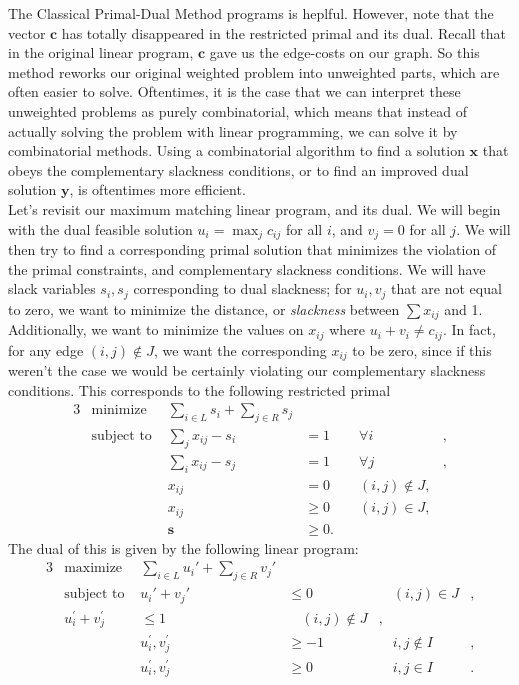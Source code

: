 \documentclass[11pt]{article}
\renewcommand{\'}{^{'}}
\begin{document}
\begin{section}{The Classical Primal-Dual Method}
	programs is heplful. However,  note that the vector $\mathbf{c}$ has totally disappeared in 
	the restricted primal and its dual. Recall that in the original linear program, $\mathbf{c}$ 
	gave us the edge-costs on our graph. So this method reworks our original weighted problem 
	into unweighted parts, which are often easier to solve. Oftentimes, it is the case that 
	we can interpret these unweighted problems as purely combinatorial, which means that instead 
	of actually solving the problem with linear programming, we can solve it by combinatorial 
	methods. Using a combinatorial algorithm to find a solution $\mathbf{x}$ that obeys the 
	complementary slackness conditions, or to find an improved dual solution $\mathbf{y}$, is 
	oftentimes more efficient.\\
	Let's revisit our maximum matching linear program, and its dual. We will begin with the dual 
	feasible solution $u_i = \max_{j} c_{ij}$ for all $i$, and $v_j = 0$ for all $j$. We will 
	then try to find a corresponding primal solution that minimizes the violation of the 
	primal constraints, and complementary slackness conditions. We will have slack variables 
	$s_i,s_j$ corresponding to dual slackness; for $u_i,v_j$ that are not equal to zero, we want 
	to minimize the distance, or \emph{slackness} between $\sum x_{ij}$ and 1. Additionally, 
	we want to minimize the values on $x_{ij}$ where $u_i + v_i \neq c_{ij}$. In fact, for any 
	edge $(i,j)\notin J$, we want the corresponding $x_{ij}$ to be zero, since if this weren't the 
	case we would be certainly violating our complementary slackness conditions. This corresponds 
	to the following restricted primal
	\begin{alignat}{3}
		& \text{minimize } & \sum_{i\in L} s_i + \sum_{j\in R} s_j & \\
		& \text{subject to } & \sum_j x_{ij} - s_i & = 1 & \quad \forall i &, \\
				     && \sum_i x_{ij} - s_j & = 1 & \quad \forall j &, \\
				     && x_{ij} & = 0 & \quad (i,j)\notin J, \\
				     && x_{ij} & \geq 0 & \quad (i,j)\in J, \\
				     && \mathbf{s} & \geq 0.
	\end{alignat}
	The dual of this is given by the following linear program:
	\begin{alignat}{3}
		& \text{maximize } & \sum_{i\in L} u_{i}\prime + \sum_{j\in R} v_{j}\prime & \\
		& \text{subject to } & u_i\prime + v_j\prime & \leq 0 & \quad (i,j)\in J &, \\
				     & u_i^{\prime} + v_j^{\prime} & \leq 1 & \quad (i,j)\notin J &, \\
				     && u_i^{'},v_j^{'} &\geq -1 & \quad i,j\notin I &, \\ 
				     && u_{i}^{'},v_j^{'} &\geq 0 & \quad i,j\in I &.
	\end{alignat}
\end{section}
\end{document}
